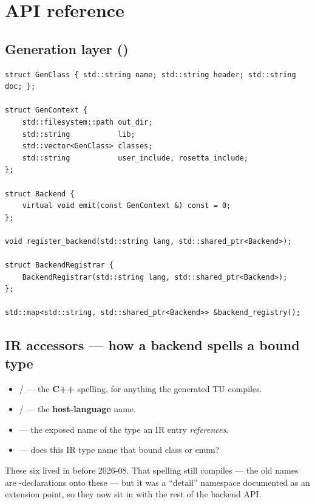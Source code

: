 \section{API reference}

\subsection*{Generation layer ()}

\begin{lstlisting}[style=cpp]
struct GenClass { std::string name; std::string header; std::string doc; };

struct GenContext {
    std::filesystem::path out_dir;
    std::string           lib;
    std::vector<GenClass> classes;
    std::string           user_include, rosetta_include;
};

struct Backend {
    virtual void emit(const GenContext &) const = 0;
};

void register_backend(std::string lang, std::shared_ptr<Backend>);

struct BackendRegistrar {
    BackendRegistrar(std::string lang, std::shared_ptr<Backend>);
};

std::map<std::string, std::shared_ptr<Backend>> &backend_registry();
\end{lstlisting}

\subsection*{IR accessors --- how a backend spells a bound type}

\begin{itemize}
  \item {} /  --- the
    \textbf{C++} spelling, for anything the generated TU compiles.
  \item {} /  --- the
    \textbf{host-language} name.
  \item {} --- the
    exposed name of the type an IR entry \emph{references}.
  \item {} --- does this IR type name
    that bound class or enum?
\end{itemize}

\begin{note}
These six lived in  before 2026-08. That spelling
still compiles --- the old names are -declarations onto these --- but
it was a ``detail'' namespace documented as an extension point, so they now sit
in  with the rest of the backend API.
\end{note}

